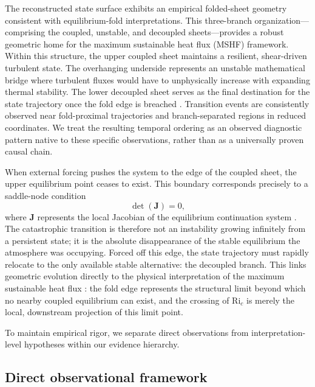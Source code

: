\documentclass[12pt,a4paper]{article}
\newcommand{\Ric}{\mathrm{Ri}_c}
\newcommand{\mat}[1]{\mathbf{#1}}
\begin{document}
The reconstructed state surface exhibits an empirical folded-sheet geometry consistent with equilibrium-fold interpretations. This three-branch organization---comprising the coupled, unstable, and decoupled sheets---provides a robust geometric home for the maximum sustainable heat flux (MSHF) framework. Within this structure, the upper coupled sheet maintains a resilient, shear-driven turbulent state. The overhanging underside represents an unstable mathematical bridge where turbulent fluxes would have to unphysically increase with expanding thermal stability. The lower decoupled sheet serves as the final destination for the state trajectory once the fold edge is breached \citep{vandewiel2017, mcnider1995}. Transition events are consistently observed near fold-proximal trajectories and branch-separated regions in reduced coordinates. We treat the resulting temporal ordering as an observed diagnostic pattern native to these specific observations, rather than as a universally proven causal chain.

When external forcing pushes the system to the edge of the coupled sheet, the upper equilibrium point ceases to exist. This boundary corresponds precisely to a saddle-node condition
\begin{equation}
\det(\mat{J}) = 0,
\end{equation}
where $\mat{J}$ represents the local Jacobian of the equilibrium continuation system \citep{derbyshire1999}. The catastrophic transition is therefore not an instability growing infinitely from a persistent state; it is the absolute disappearance of the stable equilibrium the atmosphere was occupying. Forced off this edge, the state trajectory must rapidly relocate to the only available stable alternative: the decoupled branch. This links geometric evolution directly to the physical interpretation of the maximum sustainable heat flux \citep{vandewiel2017, vignon2017}: the fold edge represents the structural limit beyond which no nearby coupled equilibrium can exist, and the crossing of $\Ric$ is merely the local, downstream projection of this limit point.

To maintain empirical rigor, we separate direct observations from interpretation-level hypotheses within our evidence hierarchy.

\subsection{Direct observational framework}
\end{document}
